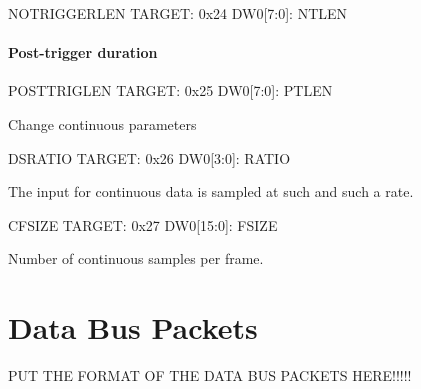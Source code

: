 \begin{dspcmd}{NOTRIGGERLEN}
TARGET: 0x24
DW0[7:0]: NTLEN
\end{dspcmd}

\paragraph{Post-trigger duration}


\begin{dspcmd}{POSTTRIGLEN}
TARGET: 0x25
DW0[7:0]: PTLEN
\end{dspcmd}

Change continuous parameters

\begin{dspcmd}{DSRATIO}
TARGET: 0x26
DW0[3:0]: RATIO
\end{dspcmd}
The input for continuous data is sampled at such and such a rate. 


\begin{dspcmd}{CFSIZE}
TARGET: 0x27
DW0[15:0]: FSIZE
\end{dspcmd}

Number of continuous samples per frame.





\section{Data Bus Packets}

PUT THE FORMAT OF THE DATA BUS PACKETS HERE!!!!!

